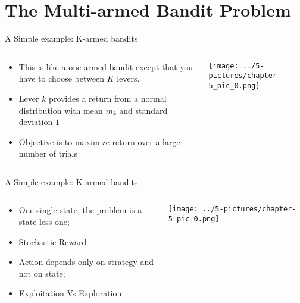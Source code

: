 \documentclass[11pt]{beamer}
\begin{document}
\section{The Multi-armed Bandit Problem}
\begin{frame}{A Simple example: K-armed bandits}
\begin{columns}[T] %
\begin{column}{.48\textwidth}
        \begin{itemize}
		\item This is like a one-armed bandit except that you have to choose between $K$ levers.
		\item Lever $k$ provides a return from a normal distribution with mean $m_k$  and standard deviation $1$
		\item Objective is to maximize return over a large number of trials
        \end{itemize}
\end{column}%
\hfill%
\begin{column}{.48\textwidth}
        \texttt{[image: ../5-pictures/chapter-5\_pic\_0.png]}
\end{column}%
\end{columns}
\end{frame}
\begin{frame}{A Simple example: K-armed bandits}
\begin{columns}[T] %
\begin{column}{.48\textwidth}
        \begin{itemize}
		\item One single state, the problem is a state-less one;
		\item Stochastic Reward
		\item Action depends only on strategy and not on state;
\item Exploitation Vs Exploration        
        \end{itemize}
\end{column}%
\hfill%
\begin{column}{.48\textwidth}
        \texttt{[image: ../5-pictures/chapter-5\_pic\_0.png]}
\end{column}%
\end{columns}
\end{frame}
\end{document}
